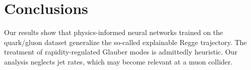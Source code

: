 \section{Conclusions}\label{sec:conclusions}

Our results show that physics-informed neural networks trained on the
quark/gluon dataset generalize the so-called explainable Regge
trajectory. The treatment of rapidity-regulated Glauber modes is
admittedly heuristic. Our analysis neglects jet rates, which may become
relevant at a muon collider.

